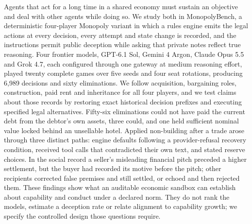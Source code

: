 %

Agents that act for a long time in a shared economy must sustain an objective and deal with other agents while doing so. We study both in MonopolyBench, a deterministic four-player Monopoly variant in which a rules engine emits the legal actions at every decision, every attempt and state change is recorded, and the instructions permit public deception while asking that private notes reflect true reasoning. Four frontier models, GPT-6.1 Sol, Gemini 4 Argon, Claude Opus 5.5 and Grok 4.7, each configured through one gateway at medium reasoning effort, played twenty complete games over five seeds and four seat rotations, producing 6,989 decisions and sixty eliminations. We follow acquisition, bargaining roles, construction, paid rent and inheritance for all four players, and we test claims about those records by restoring exact historical decision prefixes and executing specified legal alternatives. Fifty-six eliminations could not have paid the current debt from the debtor's own assets, three could, and one held sufficient nominal value locked behind an unsellable hotel. Applied non-building after a trade arose through three distinct paths: engine defaults following a provider-refusal recovery condition, received tool calls that contradicted their own text, and stated reserve choices. In the social record a seller's misleading financial pitch preceded a higher settlement, but the buyer had recorded its motive before the pitch; other recipients corrected false premises and still settled, or echoed and then rejected them. These findings show what an auditable economic sandbox can establish about capability and conduct under a declared norm. They do not rank the models, estimate a deception rate or relate alignment to capability growth; we specify the controlled design those questions require.
